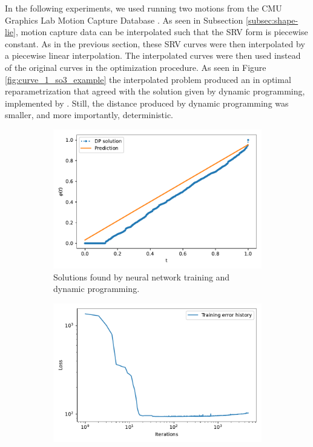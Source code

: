 In the following experiments, we used running two motions from the CMU Graphics Lab Motion Capture Database \cite{mocap}. As seen in Subsection \ref{subsec:shape-lie}, motion capture data can be interpolated such that the SRV form is piecewise constant. As in the previous section, these SRV curves were then interpolated by a piecewise linear interpolation. The interpolated curves were then used instead of the original curves in the optimization procedure. As seen in Figure \ref{fig:curve_1_so3_example} the interpolated problem produced an in optimal reparametrization that agreed with the solution given by dynamic programming, implemented by \citeauthor{lystad2019}\cite{lystad2019}. Still, the distance produced by dynamic programming was smaller, and more importantly, deterministic.

\begin{figure}[t]
    \begin{subfigure}[t]{0.5\textwidth}
        \centering
        \includegraphics[width=\linewidth]{figures/curve_so3/pc_eks_2/plot_1_0.pdf}
        \caption{Solutions found by neural network training and dynamic programming.}\label{fig:curve_so3_pc_solution}
    \end{subfigure}
    \begin{subfigure}[t]{0.5\textwidth}
        \centering
        \includegraphics[width=\linewidth]{figures/curve_so3/pc_eks_2/history_plot_1.pdf}

\end{subfigure}
\end{figure}
